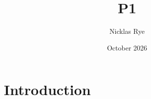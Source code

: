 \documentclass{article}
\title{P1}
\author{Nicklas Rye}
\date{October 2026}
\begin{document}
\maketitle

\section{Introduction}
\end{document}
